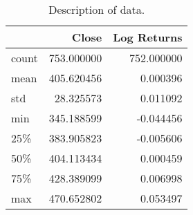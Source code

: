 \begin{table}
\centering
\caption{Description of data.}
\label{tab:data_desc}
\begin{tabular}{lrr}
\toprule
{} &       Close &  Log Returns \\
\midrule
count &  753.000000 &   752.000000 \\
mean  &  405.620456 &     0.000396 \\
std   &   28.325573 &     0.011092 \\
min   &  345.188599 &    -0.044456 \\
25\%   &  383.905823 &    -0.005606 \\
50\%   &  404.113434 &     0.000459 \\
75\%   &  428.389099 &     0.006998 \\
max   &  470.652802 &     0.053497 \\
\bottomrule
\end{tabular}
\end{table}
